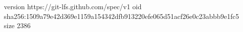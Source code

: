 version https://git-lfs.github.com/spec/v1
oid sha256:1509a79e42d369e1159a154342dfb913220efe065d51acf26e0c23abbb9e1fc5
size 2386
